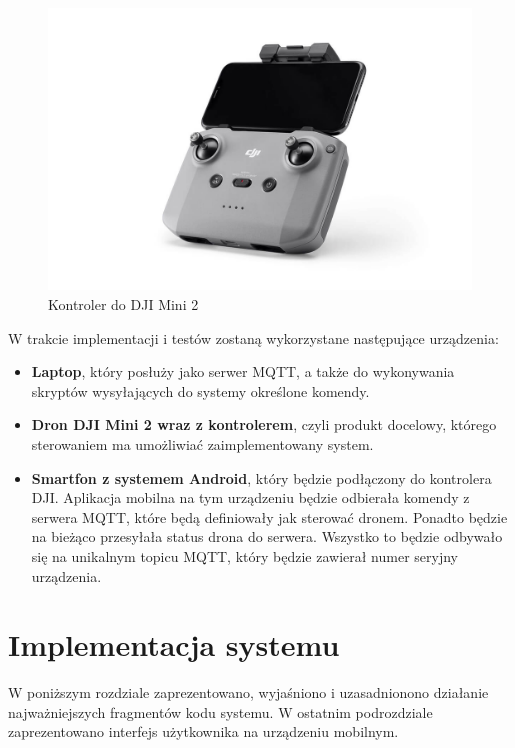 \begin{figure}[!htp]
  \centering
  \includegraphics[width=13cm]{./Obrazy/Kontroler-do-DJI-Mavic-Air-2.jpg}
  \caption{Kontroler do DJI Mini 2}
  \end{figure}

W trakcie implementacji i testów zostaną wykorzystane następujące urządzenia:
  \begin{itemize}
  \item \textbf{Laptop}, który posłuży jako serwer MQTT, a także do wykonywania skryptów wysyłających do systemy określone komendy.
  \item \textbf{Dron DJI Mini 2 wraz z kontrolerem}, czyli produkt docelowy, którego sterowaniem ma umożliwiać zaimplementowany system.
  \item \textbf{Smartfon z systemem Android}, który będzie podłączony do kontrolera DJI. Aplikacja mobilna na tym urządzeniu będzie odbierała komendy z serwera MQTT, które będą definiowały jak sterować dronem. Ponadto będzie na bieżąco przesyłała status drona do serwera. Wszystko to będzie odbywało się na unikalnym topicu MQTT, który będzie zawierał numer seryjny urządzenia.
  \end{itemize}


\clearpage
\newpage
\section{Implementacja systemu}
W poniższym rozdziale zaprezentowano, wyjaśniono i uzasadnionono działanie najważniejszych fragmentów kodu systemu. W ostatnim podrozdziale zaprezentowano interfejs użytkownika na urządzeniu mobilnym.


